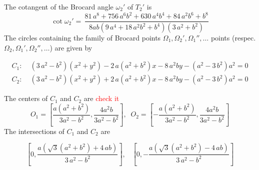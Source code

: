 The cotangent of the Brocard angle $\omega_2'$ of $T_2'$ is
\[\cot\omega_2'=  \,{\frac {81\,{a}^{8}+756\,{a}^{6}{b}^{2}+630\,{a}^{4}{b}^{4}+84\,{
a}^{2}{b}^{6}+{b}^{8}}{8ab \left( 9\,{a}^{4}+18\,{a}^{2}{b}^{2}+{b}^{4}
 \right)  \left( 3\,{a}^{2}+{b}^{2} \right) }}
  \]
The circles containing the family of Brocard points $\Omega_1,\Omega_2',\Omega_1'', \ldots$ points (respec. $\Omega_2,\Omega_1',\Omega_2'',\ldots $) are given by

\begin{align*}
    C_1:\;&\left( 3\,{a}^{2}-{b}^{2} \right) (x^2+y^2) -2\,a \left( {a}^{2}+{b}^{2} \right) x-8\,{a}^{2}b y   -
 \left( {a}^{2}-3\,{b}^{2} \right) {a}^{2} = 0
\\
    C_2:\;&\left( 3\,{a}^{2}-{b}^{2} \right) (x^2+y^2) +2\,a \left( {a}^{2}+{b}^{2} \right) x-8\,{a}^{2}b y   -
 \left( {a}^{2}-3\,{b}^{2} \right) {a}^{2} = 0
\end{align*}

The centers  of $C_1$ and $C_2$ are \textcolor{red}{check it}
  \[ O_1=\left[\frac{a(a^2+b^2)}{3a^2-b^2},\frac{ 4a^2b}{3a^2-b^2}\right],\;\;
O_2=\left[-\frac{a(a^2+b^2)}{3a^2-b^2},\frac{ 4a^2b}{3a^2-b^2}\right]
\]
The intersections of   $C_1$ and $C_2$ are 

\[ \left[0,\frac { a (\sqrt {3}({a}^{2}+ {b}^{2})+4\,ab )  }{3\,
{a}^{2}-{b}^{2}}
 \right], \;\;\; \left[0,- \frac { a (\sqrt {3}({a}^{2}+ {b}^{2})-4\,ab )  }{3\,
{a}^{2}-{b}^{2}}\right]
\]
